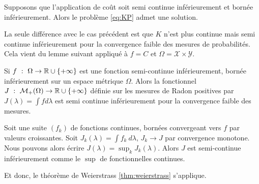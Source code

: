 \documentclass[a4paper,12pt]{article}
\begin{document}
\begin{proposition}
Supposons que l'application de coût soit semi continue inférieurement et bornée inférieurement. Alors le problème \eqref{eq:KP} admet une solution. 
\end{proposition}
\begin{preuve}
La seule différence avec le cas précédent est que $K$ n'est plus continue mais semi continue inférieurement pour la convergence faible des mesures de probabilités. Cela vient du lemme suivant appliqué à $f = C$ et $\Omega = \mathcal{X}\times\mathcal{Y}$.
\begin{lemme}
Si $f\ :\ \Omega\rightarrow \mathbb{R}\cup\{+\infty\}$ est une fonction semi-continue inférieurement, bornée inférieurement sur un espace métrique $\Omega$. Alors la fonctionnel $J \ :\ \mathcal{M}_+(\Omega )\rightarrow \RR\cup\{+\infty\}$ définie sur les mesures de Radon positives par $J(\lambda) =\int f d\lambda$ est semi continue inférieurement pour la convergence faible des mesures. 
\end{lemme}
\begin{preuve}
Soit une suite $(f_k)$ de fonctions continues, bornées convergeant vers $f$ par valeurs croissantes. 
Soit $J_k(\lambda ) =\int f_k\ d\lambda$, $J_k\rightarrow J$ par convergence monotone. Nous pouvons alors écrire $J(\lambda )=\sup_k J_k(\lambda )$.
Alors $J$ est semi-continue inférieurement comme le $\sup$ de fonctionnelles continues.
\end{preuve}
Et donc, le théorème de Weierstrass \eqref{thm:weierstrass} s'applique.
\end{preuve}
\end{document}
